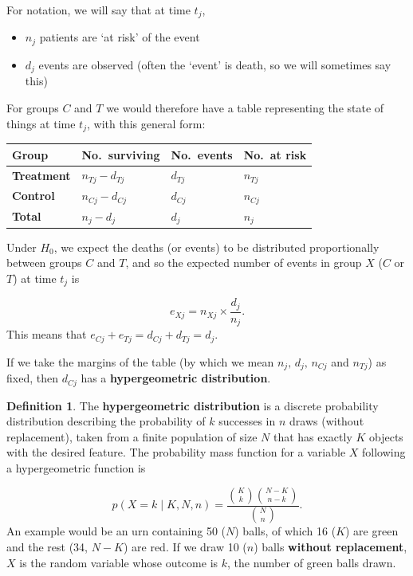 \documentclass[
  openany]{book}
\providecommand{\tightlist}{%
  \setlength{\itemsep}{0pt}\setlength{\parskip}{0pt}}
\theoremstyle{definition}
\newtheorem{definition}{Definition}[chapter]
\theoremstyle{definition}
\theoremstyle{definition}
\theoremstyle{definition}
\theoremstyle{remark}
\begin{document}
For notation, we will say that at time \(t_j\),

\begin{itemize}
\tightlist
\item
  \(n_j\) patients are `at risk' of the event
\item
  \(d_j\) events are observed (often the `event' is death, so we will sometimes say this)
\end{itemize}

For groups \(C\) and \(T\) we would therefore have a table representing the state of things at time \(t_j\), with this general form:

\begin{longtable}[]{@{}llll@{}}
\toprule\noalign{}
Group & No.~surviving & No.~events & No.~at risk \\
\midrule\noalign{}
\endhead
\bottomrule\noalign{}
\endlastfoot
\textbf{Treatment} & \(n_{Tj}-d_{Tj}\) & \(d_{Tj}\) & \(n_{Tj}\) \\
\textbf{Control} & \(n_{Cj}-d_{Cj}\) & \(d_{Cj}\) & \(n_{Cj}\) \\
\textbf{Total} & \(n_j-d_j\) & \(d_j\) & \(n_j\) \\
\end{longtable}

Under \(H_0\), we expect the deaths (or events) to be distributed proportionally between groups \(C\) and \(T\), and so the expected number of events in group \(X\) (\(C\) or \(T\)) at time \(t_j\) is

\[e_{Xj} = n_{Xj}\times{\frac{d_j}{n_j}}.\]
This means that \(e_{Cj}+e_{Tj} = d_{Cj} + d_{Tj} = d_j\).

If we take the margins of the table (by which we mean \(n_j, \,d_j,\,n_{Cj}\) and \(n_{Tj}\)) as fixed, then \(d_{Cj}\) has a \textbf{hypergeometric distribution}.

\begin{definition}
The \textbf{hypergeometric distribution} is a discrete probability distribution describing the probability of \(k\) successes in \(n\) draws (without replacement), taken from a finite population of size \(N\) that has exactly \(K\) objects with the desired feature. The probability mass function for a variable \(X\) following a hypergeometric function is

\[p\left(X=k\mid{K,N,n}\right) = \frac{{\binom{K}{k}}{\binom{N-K}{n-k}}}{{\binom{N}{n}}}. \]
An example would be an urn containing 50 (\(N\)) balls, of which 16 (\(K\)) are green and the rest (34, \(N-K\)) are red. If we draw 10 (\(n\)) balls \textbf{without replacement}, \(X\) is the random variable whose outcome is \(k\), the number of green balls drawn.
\end{definition}
\end{document}

